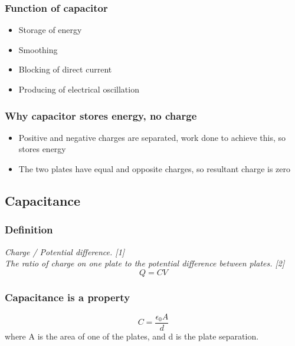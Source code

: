 \documentclass[a4paper,9pt]{scrartcl}
\begin{document}
    \subsubsection{Function of capacitor}
    \begin{itemize}
        \item Storage of energy
        \item Smoothing
        \item Blocking of direct current
        \item Producing of electrical oscillation
    \end{itemize}

    \subsubsection{Why capacitor stores energy, no charge}
    \begin{itemize}
        \item Positive and negative charges are separated, work done to achieve this, so stores energy
        \item The two plates have equal and opposite charges, so resultant charge is zero
    \end{itemize}

    \subsection{Capacitance}

    \subsubsection{Definition}
    \textit{Charge / Potential difference. [1]}\\
    \textit{The ratio of charge on one plate to the potential difference between plates. [2]}\\
    \begin{displaymath}
        Q = CV
    \end{displaymath}

    \subsubsection{Capacitance is a property}
    \begin{displaymath}
        C = \frac{\epsilon_{0}A}{d}
    \end{displaymath}
    where A is the area of one of the plates, and d is the plate separation.
\end{document}
